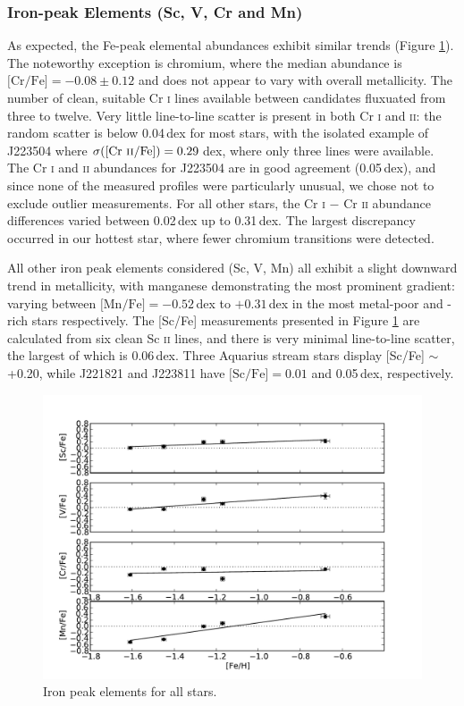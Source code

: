\documentclass{emulateapj}
\begin{document}
\subsubsection{Iron-peak Elements (Sc, V, Cr and Mn)}

As expected, the Fe-peak elemental abundances exhibit similar trends (Figure \ref{fig:fe-peak-elements}). The noteworthy exception is chromium, where the median abundance is $\mbox{[Cr/Fe]} = -0.08 \pm 0.12$ and does not appear to vary with overall metallicity. The number of clean, suitable Cr \textsc{i} lines available between candidates fluxuated from three to twelve. Very little line-to-line scatter is present in both Cr \textsc{i} and \textsc{ii}: the random scatter is below 0.04\,dex for most stars, with the isolated example of J223504 where $\sigma(\mbox{[Cr \textsc{ii}/Fe]}) = 0.29$\,dex, where only three lines were available. The Cr \textsc{i} and \textsc{ii} abundances for J223504 are in good agreement (0.05\,dex), and since none of the measured profiles were particularly unusual, we chose not to exclude outlier measurements. For all other stars, the Cr \textsc{i} $-$ Cr \textsc{ii} abundance differences varied between 0.02\,dex up to 0.31\,dex. The largest discrepancy occurred in our hottest star, where fewer chromium transitions were detected.

All other iron peak elements considered (Sc, V, Mn) all exhibit a slight downward trend in metallicity, with manganese demonstrating the most prominent gradient: varying between $\mbox{[Mn/Fe]} = -0.52$\,dex to $+0.31$\,dex in the most metal-poor and -rich stars respectively. The [Sc/Fe] measurements presented in Figure \ref{fig:fe-peak-elements} are calculated from six clean Sc \textsc{ii} lines, and there is very minimal line-to-line scatter, the largest of which is 0.06\,dex. Three Aquarius stream stars display [Sc/Fe] $\sim$ +0.20, while J221821 and J223811 have $\mbox{[Sc/Fe]} = 0.01$ and 0.05\,dex, respectively.

\begin{figure}[h]
	\includegraphics[width=\columnwidth]{./figures/aquarius-fe-peak.pdf}
	\caption{Iron peak elements for all stars.}
	\label{fig:fe-peak-elements}
\end{figure}
\end{document}
